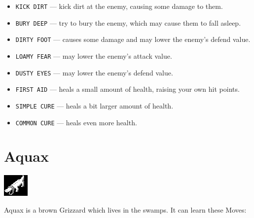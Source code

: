\documentclass[10pt,twocolumn,openany,article]{memoir}
\begin{document}
\begin{description}
\begin{itemize}
\item \texttt{KICK DIRT} --- kick dirt at the enemy, causing some damage
  to them.
\item \texttt{BURY DEEP} --- try to bury the enemy, which may cause them
  to fall asleep.
\item  \texttt{DIRTY FOOT}  --- causes  some  damage and  may lower  the
  enemy's defend value.
\item \texttt{LOAMY FEAR} --- may lower the enemy's attack value.
\item \texttt{DUSTY EYES} --- may lower the enemy's defend value.
\item \texttt{FIRST  AID} ---  heals a small  amount of  health, raising
  your own hit points.
\item \texttt{SIMPLE CURE} --- heals a bit larger amount of health.
\item \texttt{COMMON CURE} --- heals even more health.
\end{itemize}

\fi

\section{Aquax}

\includegraphics[width=\columnwidth]{../Source/Banks/Bank00/Grizzard1-1.png}

Aquax is a brown Grizzard which lives  in the swamps. It can learn these
Moves:


\end{description}
\end{document}
